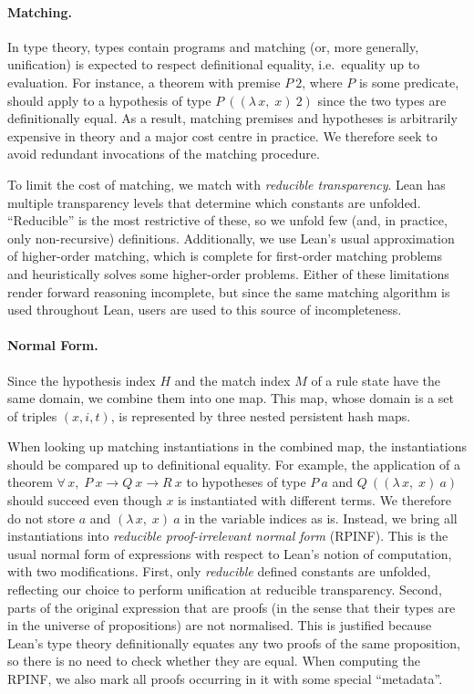 \documentclass[runningheads,leqno]{llncs}
\newcommand{\para}[1]{\paragraph{\bfseries\upshape #1}}
\newcommand{\Lam}[2]{\ensuremath{\lambda\, #1,\; #2}}
\newcommand{\All}[2]{\ensuremath{\forall\, #1,\; #2}}
\begin{document}
\para{Matching.}
In type theory, types contain programs and matching (or, more generally, unification) is expected to respect definitional equality, i.e.\ equality up to evaluation.
For instance, a theorem with premise $P~2$, where $P$ is some predicate, should apply to a hypothesis of type $P~((\Lam{x}{x})~2)$ since the two types are definitionally equal.
As a result, matching premises and hypotheses is arbitrarily expensive in theory and a major cost centre in practice.
We therefore seek to avoid redundant invocations of the matching procedure.

To limit the cost of matching, we match with \emph{reducible transparency}.
Lean has multiple transparency levels that determine which constants are unfolded.
\enquote{Reducible} is the most restrictive of these, so we unfold few (and, in practice, only non-recursive) definitions.
Additionally, we use Lean's usual approximation of higher-order matching, which is complete for first-order matching problems and heuristically solves some higher-order problems.
Either of these limitations render forward reasoning incomplete, but since the same matching algorithm is used throughout Lean, users are used to this source of incompleteness.

\para{Normal Form.}
Since the hypothesis index $H$ and the match index $M$ of a rule state have the same domain, we combine them into one map.
This map, whose domain is a set of triples $(x, i, t)$, is represented by three nested persistent hash maps.

When looking up matching instantiations in the combined map, the instantiations should be compared up to definitional equality.
For example, the application of a theorem $\All{x}{P~x → Q~x → R~x}$ to hypotheses of type $P~a$ and $Q~((\Lam{x}{x})~a)$ should succeed even though $x$ is instantiated with different terms.
We therefore do not store $a$ and $(\Lam{x}{x})~a$ in the variable indices as is.
Instead, we bring all instantiations into \emph{reducible proof-irrelevant normal form} (RPINF).
This is the usual normal form of expressions with respect to Lean's notion of computation, with two modifications.
First, only \emph{reducible} defined constants are unfolded, reflecting our choice to perform unification at reducible transparency.
Second, parts of the original expression that are proofs (in the sense that their types are in the universe of propositions) are not normalised.
This is justified because Lean's type theory definitionally equates any two proofs of the same proposition, so there is no need to check whether they are equal.
When computing the RPINF, we also mark all proofs occurring in it with some special \enquote{metadata}.
\end{document}
